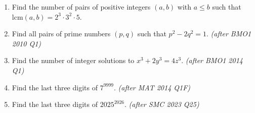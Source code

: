\documentclass[11pt,a4paper]{article}
\begin{document}
\begin{enumerate}

\item Find the number of pairs of positive integers $(a,b)$ with $a \le b$ such that $\text{lcm}(a,b) = 2^3 \cdot 3^2 \cdot 5$.

\item Find all pairs of prime numbers $(p,q)$ such that $p^2 - 2q^2 = 1$. \textit{\small(after BMO1 2010 Q1)}

\item Find the number of integer solutions to $x^3 + 2y^3 = 4z^3$. \textit{\small(after BMO1 2014 Q1)}

\item Find the last three digits of $7^{9999}$. \textit{\small(after MAT 2014 Q1F)}

\item Find the last three digits of $2025^{2026}$. \textit{\small(after SMC 2023 Q25)}

\end{enumerate}

\end{document}

